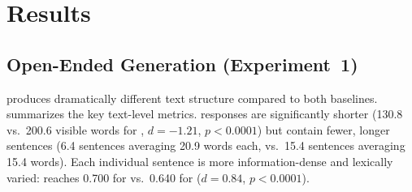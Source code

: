\section{Results}
\label{sec:results}

\subsection{Open-Ended Generation (Experiment~1)}
\label{sec:exp1}

\iscotshort produces dramatically different text structure compared to both baselines.
 summarizes the key text-level metrics.
\iscotshort responses are significantly shorter (130.8 vs.\ 200.6 visible words for \standard, $d = -1.21$, $p < 0.0001$) but contain fewer, longer sentences (6.4 sentences averaging 20.9 words each, vs.\ 15.4 sentences averaging 15.4 words).
Each individual sentence is more information-dense and lexically varied: \ttr reaches 0.700 for \iscotshort vs.\ 0.640 for \standard ($d = 0.84$, $p < 0.0001$).

\begin{table}[t]
\centering
\caption{Text metrics for open-ended generation (Experiment~1). Values are mean $\pm$ standard deviation across 30 prompts. Best values per metric in \textbf{bold}. Significance tests compare \standard vs.\ \iscotshort using the Wilcoxon signed-rank test.}
\label{tab:text_metrics}
\end{table}

